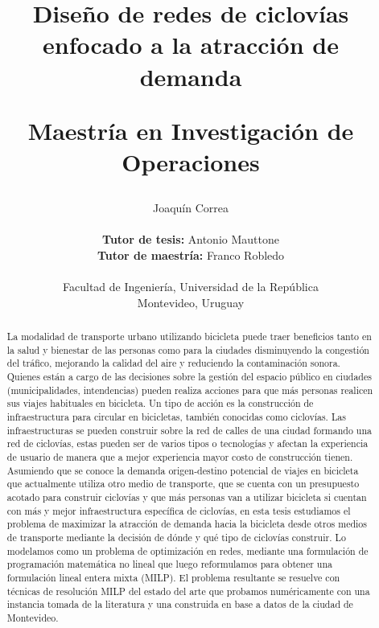 \documentclass{article}
\begin{document}
  \title{
    Diseño de redes de ciclovías enfocado a la atracción de demanda

    {\sc \large Maestría en Investigación de Operaciones}
    \linebreak
  }
  \author{
    Joaquín Correa \\
    \\
    {\small \textbf{ Tutor de tesis:} Antonio Mauttone} \\
    {\small \textbf{ Tutor de maestría:} Franco Robledo} \\
    \\
    {\small Facultad de Ingeniería, Universidad de la República} \\

    {\small Montevideo, Uruguay}
  }
  \maketitle

  \newpage
  \tableofcontents

  \newpage
  \begin{abstract}
    La modalidad de transporte urbano utilizando bicicleta puede traer beneficios tanto en la salud y bienestar de las personas como para la ciudades disminuyendo la congestión del tráfico, mejorando la calidad del aire y reduciendo la contaminación sonora. Quienes están a cargo de las decisiones sobre la gestión del espacio público en ciudades (municipalidades, intendencias) pueden realiza acciones para que más personas realicen sus viajes habituales en bicicleta. Un tipo de acción es la construcción de infraestructura para circular en bicicletas, también conocidas como ciclovías. Las infraestructuras se pueden construir sobre la red de calles de una ciudad formando una red de ciclovías, estas pueden ser de varios tipos o tecnologías y afectan la experiencia de usuario de manera que a mejor experiencia mayor costo de construcción tienen. Asumiendo que se conoce la demanda origen-destino potencial de viajes en bicicleta que actualmente utiliza otro medio de transporte, que se cuenta con un presupuesto acotado para construir ciclovías y que más personas van a utilizar bicicleta si cuentan con más y mejor infraestructura específica de ciclovías, en esta tesis estudiamos el problema de maximizar la atracción de demanda hacia la bicicleta desde otros medios de transporte mediante la decisión de dónde y qué tipo de ciclovías construir. Lo modelamos como un problema de optimización en redes, mediante una formulación de programación matemática no lineal que luego reformulamos para obtener una formulación lineal entera mixta (MILP). El problema resultante se resuelve con técnicas de resolución MILP del estado del arte que probamos numéricamente con una instancia tomada de la literatura y una construida en base a datos de la ciudad de Montevideo.
  \end{abstract}
\end{document}

